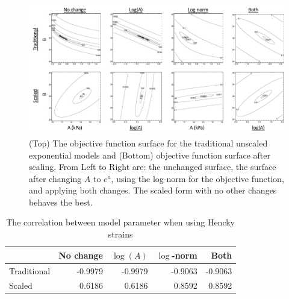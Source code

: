     
\begin{figure}
\centering
\includegraphics[width=\textwidth]{Images/chapter5/objfunctionsurfaces}
\caption{(Top) The objective function surface for the traditional unscaled exponential models and (Bottom) objective function surface after scaling. From Left to Right are: the unchanged surface, the surface after changing $A$ to $e^{a}$, using the log-norm for the objective function, and applying both changes. The scaled form with no other changes behaves the best.}
\label{fig:objfunctionsurfaces}
\end{figure} 


\begin{table}
\caption{The correlation between model parameter when using Hencky strains}
\begin{center}
\label{tb:ABcorrelation}
\begin{tabular}{|l|rrrr|}
\hline
			& No change	& $\log(A)$	& $\log$-norm	& Both \\
\hline
Traditional	& -0.9979	& -0.9979	& -0.9063		& -0.9063 \\
Scaled 		& 0.6186	& 0.6186	& 0.8592		& 0.8592 \\
\hline
\end{tabular}
\end{center}
\end{table}




